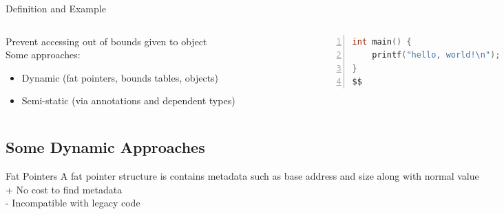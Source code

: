 \documentclass[aspectratio=169]{beamer}
\begin{document}
\begin{frame}[fragile]{Definition and Example}
  \footnotesize
  \begin{columns}[T]
    \begin{column}{0.45\textwidth}
        Prevent accessing out of bounds given to object
        \\
        Some approaches:
        \begin{itemize}
            \item Dynamic \small{(fat pointers, bounds tables, objects)}
            \item Semi-static \small{(via annotations and dependent types})
        \end{itemize}
    \end{column}
    \begin{column}{0.45\textwidth}
%      
       \begin{lstlisting}[language=C,numbers=left,mathescape,basicstyle={\footnotesize\ttfamily}]
int main() {
    printf("hello, world!\n");
}
$$
        \end{lstlisting}
    \end{column}
  \end{columns}
\end{frame}

\subsection{Some Dynamic Approaches}

\begin{frame}[fragile]{Fat Pointers}
  \footnotesize
A fat pointer structure is contains metadata such as base address and size along with normal value
\\
+ No cost to find metadata
\\
- Incompatible with legacy code
\end{frame}
\end{document}
